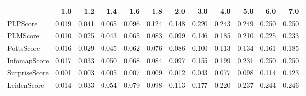 \begin{tabular}{lrrrrrrrrrrr}
\toprule
{} &   1.0 &   1.2 &   1.4 &   1.6 &   1.8 &   2.0 &   3.0 &   4.0 &   5.0 &   6.0 &   7.0 \\
\midrule
PLPScore      & 0.019 & 0.041 & 0.065 & 0.096 & 0.124 & 0.148 & 0.220 & 0.243 & 0.249 & 0.250 & 0.250 \\
PLMScore      & 0.010 & 0.025 & 0.043 & 0.065 & 0.083 & 0.099 & 0.146 & 0.185 & 0.210 & 0.225 & 0.233 \\
PottsScore    & 0.016 & 0.029 & 0.045 & 0.062 & 0.076 & 0.086 & 0.100 & 0.113 & 0.134 & 0.161 & 0.185 \\
InfomapScore  & 0.017 & 0.033 & 0.050 & 0.068 & 0.084 & 0.097 & 0.155 & 0.199 & 0.231 & 0.250 & 0.250 \\
SurpriseScore & 0.001 & 0.003 & 0.005 & 0.007 & 0.009 & 0.012 & 0.043 & 0.077 & 0.098 & 0.114 & 0.123 \\
LeidenScore   & 0.014 & 0.033 & 0.054 & 0.079 & 0.098 & 0.113 & 0.177 & 0.220 & 0.237 & 0.244 & 0.246 \\
\bottomrule
\end{tabular}
